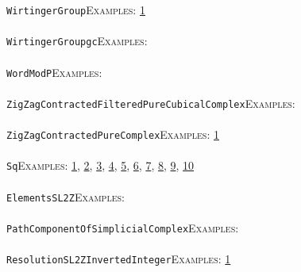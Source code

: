 \documentclass[a4paper,11pt]{report}
\begin{document}
{{ \texttt{WirtingerGroup}{\nobreakspace}{\nobreakspace}{\nobreakspace}{\nobreakspace}\textsc{Examples:} \href{../www/SideLinks/About/aboutQuandles.html} {1}{\nobreakspace} \\
 \\
 \texttt{WirtingerGroup{\textunderscore}gc}{\nobreakspace}{\nobreakspace}{\nobreakspace}{\nobreakspace}\textsc{Examples:} \\
 \\
 \texttt{WordModP}{\nobreakspace}{\nobreakspace}{\nobreakspace}{\nobreakspace}\textsc{Examples:} \\
 \\
 \texttt{ZigZagContractedFilteredPureCubicalComplex}{\nobreakspace}{\nobreakspace}{\nobreakspace}{\nobreakspace}\textsc{Examples:} \\
 \\
 \texttt{ZigZagContractedPureComplex}{\nobreakspace}{\nobreakspace}{\nobreakspace}{\nobreakspace}\textsc{Examples:} \href{../www/SideLinks/About/aboutPeripheral.html} {1}{\nobreakspace} \\
 \\
 \texttt{Sq}{\nobreakspace}{\nobreakspace}{\nobreakspace}{\nobreakspace}\textsc{Examples:} \href{tutorial/chap7.html} {1}{\nobreakspace}, \href{tutorial/chap10.html} {2}{\nobreakspace}, \href{../www/SideLinks/About/aboutArtinGroups.html} {3}{\nobreakspace}, \href{../www/SideLinks/About/aboutModPRings.html} {4}{\nobreakspace}, \href{../www/SideLinks/About/aboutAspherical.html} {5}{\nobreakspace}, \href{../www/SideLinks/About/aboutNonabelian.html} {6}{\nobreakspace}, \href{../www/SideLinks/About/aboutQuandles2.html} {7}{\nobreakspace}, \href{../www/SideLinks/About/aboutKnots.html} {8}{\nobreakspace}, \href{../www/SideLinks/About/aboutTensorSquare.html} {9}{\nobreakspace}, \href{../www/SideLinks/About/aboutKnotsQuandles.html} {10}{\nobreakspace} \\
 \\
 \texttt{ElementsSL2Z}{\nobreakspace}{\nobreakspace}{\nobreakspace}{\nobreakspace}\textsc{Examples:} \\
 \\
 \texttt{PathComponentOfSimplicialComplex}{\nobreakspace}{\nobreakspace}{\nobreakspace}{\nobreakspace}\textsc{Examples:} \\
 \\
 \texttt{ResolutionSL2ZInvertedInteger}{\nobreakspace}{\nobreakspace}{\nobreakspace}{\nobreakspace}\textsc{Examples:} \href{tutorial/chap10.html} {1}{\nobreakspace} \\
 \\
}}
\end{document}
